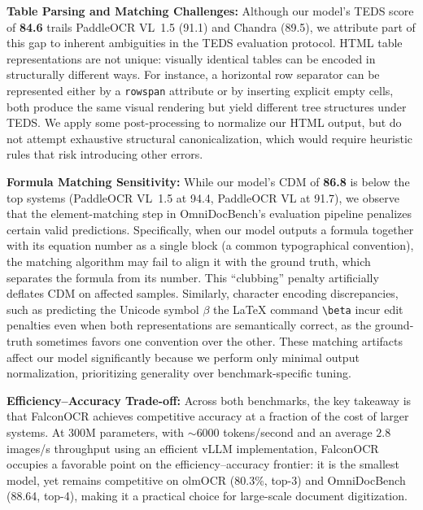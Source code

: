 \noindent \textbf{Table Parsing and Matching Challenges:} Although our model's TEDS score of \textbf{84.6} trails PaddleOCR VL~1.5 (91.1) and Chandra (89.5), we attribute part of this gap to inherent ambiguities in the TEDS evaluation protocol. HTML table representations are not unique: visually identical tables can be encoded in structurally different ways. For instance, a horizontal row separator can be represented either by a \texttt{rowspan} attribute or by inserting explicit empty cells, both produce the same visual rendering but yield different tree structures under TEDS. We apply some post-processing to normalize our HTML output, but do not attempt exhaustive structural canonicalization, which would require heuristic rules that risk introducing other errors.

\noindent \textbf{Formula Matching Sensitivity:} While our model's CDM of \textbf{86.8} is below the top systems (PaddleOCR VL~1.5 at 94.4, PaddleOCR VL at 91.7), we observe that the element-matching step in OmniDocBench's evaluation pipeline penalizes certain valid predictions. Specifically, when our model outputs a formula together with its equation number as a single block (a common typographical convention), the matching algorithm may fail to align it with the ground truth, which separates the formula from its number. This ``clubbing'' penalty artificially deflates CDM on affected samples. Similarly, character encoding discrepancies, such as predicting the Unicode symbol $\beta$ \vs the \LaTeX{} command \texttt{\textbackslash beta} incur edit penalties even when both representations are semantically correct, as the ground-truth sometimes favors one convention over the other. These matching artifacts affect our model significantly because we perform only minimal output normalization, prioritizing generality over benchmark-specific tuning.


\noindent \textbf{Efficiency--Accuracy Trade-off:} Across both benchmarks, the key takeaway is that FalconOCR achieves competitive accuracy at a fraction of the cost of larger systems. At 300M parameters, with ${\sim}\num{6000}$ tokens/second and an average $2.8$ images/s throughput using an efficient vLLM implementation, FalconOCR occupies a favorable point on the efficiency--accuracy frontier: it is the smallest model, yet remains competitive on olmOCR (80.3\%, top-3) and OmniDocBench (88.64, top-4), making it a practical choice for large-scale document digitization.
